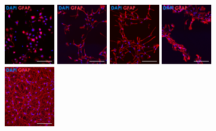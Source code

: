 \documentclass[onecolumn,10pt]{asme2ej}
\begin{document}
\begin{figure}[h]
	\includegraphics[width=0.196\textwidth]{figures/IF/charac(light)/d0-g}
	\includegraphics[width=0.196\textwidth]{figures/IF/charac(light)/d3-g}	\includegraphics[width=0.196\textwidth]{figures/IF/charac(light)/d7-g}	\includegraphics[width=0.196\textwidth]{figures/IF/charac(light)/d14-g}	\includegraphics[width=0.196\textwidth]{figures/IF/charac(light)/d21-g}
	

\end{figure}
\end{document}
